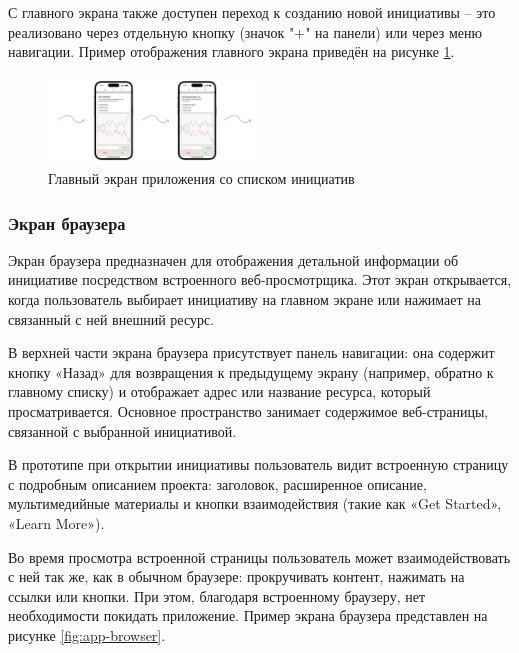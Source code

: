 \documentclass[
    candidate, %
    subf, %
    dotsinheaders=false,
]{disser}
\begin{document}
С главного экрана также доступен переход к созданию новой инициативы – это реализовано через отдельную кнопку (значок "+" на панели) или через меню навигации. Пример отображения главного экрана приведён на рисунке \ref{fig:app-main-flow}.

\begin{figure}[h]
  \centering
  \includegraphics[width=0.5\textwidth]{./assets/app-main-flow.png}
  \caption{Главный экран приложения со списком инициатив}
  \label{fig:app-main-flow}
\end{figure}

\subsubsection{Экран браузера}

Экран браузера предназначен для отображения детальной информации об инициативе посредством встроенного веб-просмотрщика. Этот экран открывается, когда пользователь выбирает инициативу на главном экране или нажимает на связанный с ней внешний ресурс.

В верхней части экрана браузера присутствует панель навигации: она содержит кнопку «Назад» для возвращения к предыдущему экрану (например, обратно к главному списку) и отображает адрес или название ресурса, который просматривается. Основное пространство занимает содержимое веб-страницы, связанной с выбранной инициативой.

В прототипе при открытии инициативы пользователь видит встроенную страницу с подробным описанием проекта: заголовок, расширенное описание, мультимедийные материалы и кнопки взаимодействия (такие как «Get Started», «Learn More»).

Во время просмотра встроенной страницы пользователь может взаимодействовать с ней так же, как в обычном браузере: прокручивать контент, нажимать на ссылки или кнопки. При этом, благодаря встроенному браузеру, нет необходимости покидать приложение. Пример экрана браузера представлен на рисунке \ref{fig:app-browser}.
\end{document}
